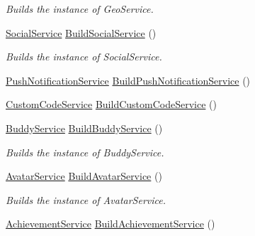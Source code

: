 \begin{DoxyCompactItemize}
\begin{DoxyCompactList}\small\item\em Builds the instance of Geo\+Service. \end{DoxyCompactList}\item 
\hyperlink{classcom_1_1shephertz_1_1app42_1_1paas_1_1sdk_1_1csharp_1_1social_1_1_social_service}{Social\+Service} \hyperlink{classcom_1_1shephertz_1_1app42_1_1paas_1_1sdk_1_1csharp_1_1_service_a_p_i_a68d5f0709c8769201fdda8acc3a1e30c}{Build\+Social\+Service} ()
\begin{DoxyCompactList}\small\item\em Builds the instance of Social\+Service. \end{DoxyCompactList}\item 
\hyperlink{classcom_1_1shephertz_1_1app42_1_1paas_1_1sdk_1_1csharp_1_1push_notification_1_1_push_notification_service}{Push\+Notification\+Service} \hyperlink{classcom_1_1shephertz_1_1app42_1_1paas_1_1sdk_1_1csharp_1_1_service_a_p_i_a503f88237eff832de46d5c1e3a1c8811}{Build\+Push\+Notification\+Service} ()
\item 
\hyperlink{classcom_1_1shephertz_1_1app42_1_1paas_1_1sdk_1_1csharp_1_1customcode_1_1_custom_code_service}{Custom\+Code\+Service} \hyperlink{classcom_1_1shephertz_1_1app42_1_1paas_1_1sdk_1_1csharp_1_1_service_a_p_i_abf7181365c20f73a693a1db63687719e}{Build\+Custom\+Code\+Service} ()
\item 
\hyperlink{classcom_1_1shephertz_1_1app42_1_1paas_1_1sdk_1_1csharp_1_1buddy_1_1_buddy_service}{Buddy\+Service} \hyperlink{classcom_1_1shephertz_1_1app42_1_1paas_1_1sdk_1_1csharp_1_1_service_a_p_i_a67bfe47b87cc778b66f397a2e43a22c8}{Build\+Buddy\+Service} ()
\begin{DoxyCompactList}\small\item\em Builds the instance of Buddy\+Service. \end{DoxyCompactList}\item 
\hyperlink{classcom_1_1shephertz_1_1app42_1_1paas_1_1sdk_1_1csharp_1_1avatar_1_1_avatar_service}{Avatar\+Service} \hyperlink{classcom_1_1shephertz_1_1app42_1_1paas_1_1sdk_1_1csharp_1_1_service_a_p_i_a5ed1182d75cf0b447dd52a29c0710601}{Build\+Avatar\+Service} ()
\begin{DoxyCompactList}\small\item\em Builds the instance of Avatar\+Service. \end{DoxyCompactList}\item 
\hyperlink{classcom_1_1shephertz_1_1app42_1_1paas_1_1sdk_1_1csharp_1_1achievement_1_1_achievement_service}{Achievement\+Service} \hyperlink{classcom_1_1shephertz_1_1app42_1_1paas_1_1sdk_1_1csharp_1_1_service_a_p_i_a64efccc81c55f1a2b4599859156ec6e5}{Build\+Achievement\+Service} ()

\end{DoxyCompactItemize}
